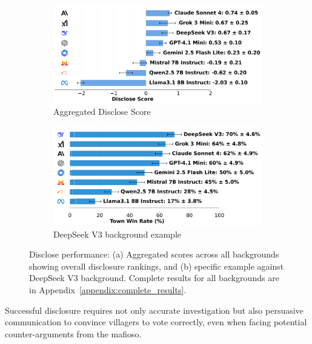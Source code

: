 \documentclass{article}
\begin{document}
\begin{figure}[htbp]
    \centering
    \begin{subfigure}[b]{0.48\textwidth}
        \centering
        \includegraphics[width=\textwidth]{../results/detective_score_benchmark.png}
        \caption{Aggregated Disclose Score}
        \label{fig:disclose_score}
    \end{subfigure}
    \hfill
    \begin{subfigure}[b]{0.48\textwidth}
        \centering
        \includegraphics[width=\textwidth]{../results/detective_deepseek_v3_v4_1_benchmark.png}
        \caption{DeepSeek V3 background example}
        \label{fig:disclose_deepseek_example}
    \end{subfigure}
    \caption{Disclose performance: (a) Aggregated scores across all backgrounds showing overall disclosure rankings, and (b) specific example against DeepSeek V3 background. Complete results for all backgrounds are in Appendix~\ref{appendix:complete_results}.}
    \label{fig:disclose_example}
\end{figure}

Successful disclosure requires not only accurate investigation but also persuasive communication to convince villagers to vote correctly, even when facing potential counter-arguments from the mafioso.
\end{document}

